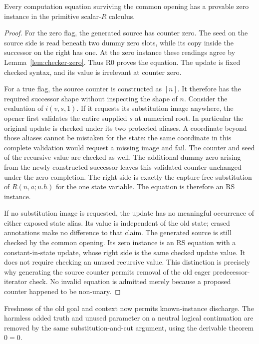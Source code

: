 \begin{lemma}
Every computation equation surviving the common opening has a provable
zero instance in the primitive scalar-$R$ calculus.
\end{lemma}
\begin{proof}
For the zero flag, the generated source has counter zero. The seed on
the source side is read beneath two dummy zero slots, while its copy
inside the successor on the right has one. At the zero instance these
readings agree by Lemma~\ref{lem:checker-zero}. Thus R0 proves the
equation. The update is fixed checked syntax, and its value is irrelevant
at counter zero.

For a true flag, the source counter is constructed as $[n]$. It therefore
has the required successor shape without inspecting the shape of $n$.
Consider the evaluation of $i(v,s,1)$. If it requests its substitution
image anywhere, the opener first validates the entire supplied $s$ at
numerical root. In particular the original update is checked under its
two protected aliases. A coordinate beyond those aliases cannot be
mistaken for the state: the same coordinate in this complete validation
would request a missing image and fail. The counter and seed of the
recursive value are checked as well. The additional dummy zero arising
from the newly constructed successor leaves this validated counter
unchanged under the zero completion. The right side is exactly the
capture-free substitution of $R(n,a;u.h)$ for the one state variable.
The equation is therefore an RS instance.

If no substitution image is requested, the update has no meaningful
occurrence of either exposed state alias. Its value is independent of
the old state; erased annotations make no difference to that
claim. The generated source is still checked by the common opening.
Its zero instance is an RS equation with a constant-in-state update,
whose right side is the same checked update value. It does not require
checking an unused recursive value. This distinction is precisely why
generating the source counter permits removal of the old eager
predecessor-iterator check. No invalid equation is admitted merely
because a proposed counter happened to be non-unary.
\end{proof}

Freshness of the old goal and context now permits known-instance
discharge. The harmless added truth and unused parameter on a neutral
logical continuation are removed by the same substitution-and-cut
argument, using the derivable theorem $0=0$.

